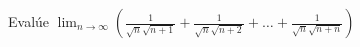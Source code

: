 \item Evalúe $\displaystyle \lim_{n \to \infty} \left( \frac{1}{\sqrt{n}\sqrt{n+1}} + \frac{1}{\sqrt{n}\sqrt{n+2}} + \dots + \frac{1}{\sqrt{n}\sqrt{n+n}} \right)$
